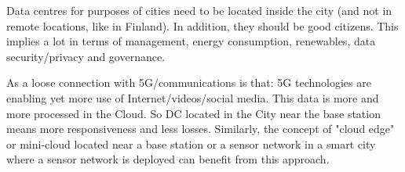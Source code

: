 Data centres for purposes of cities need to be located inside the city (and not in remote locations, like in Finland). In addition, they should be good citizens. This implies a lot in terms of management, energy consumption, renewables, data security/privacy and governance.

As a loose connection with 5G/communications is that: 5G technologies are enabling yet more use of Internet/videos/social media. This data is more and more processed in the Cloud. So DC located in the City near the base station means more responsiveness and less losses. Similarly, the concept of "cloud edge" or mini-cloud located near a base station or a sensor network in a smart city where a sensor network is deployed can benefit from this approach. %